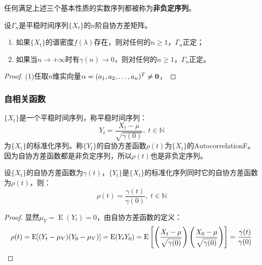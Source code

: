 \begin{definition}
	任何满足上述三个基本性质的实数序列都被称为\textbf{非负定序列}。
\end{definition}
\begin{theorem}\label{theo:GammaPositiveDefinite}
	设$\Gamma_n$是平稳时间序列$\{X_t\}$的$n$阶自协方差矩阵。
	\begin{enumerate}
		\item 如果$\{X_t\}$的谱密度$f(\lambda)$存在，则对任何的$n\geqslant1$，$\Gamma_n$正定；
		\item 如果当$n\to+\infty$时有$\gamma(n)\to0$，则对任何的$n\geqslant1$，$\Gamma_n$正定。
	\end{enumerate}
\end{theorem}
\begin{proof}
	(1)任取$n$维实向量$\alpha=(a_1, a_2, \dots, a_{n})^T\ne\mathbf{0}$，
\end{proof}
\subsubsection{自相关函数}
\begin{definition}
	$\{X_t\}$是一个平稳时间序列，称平稳时间序列：
	\begin{equation*}
		Y_t=\frac{X_t-\mu}{\sqrt{\gamma(0)}},\;t\in\mathbb{N}
	\end{equation*}
	为$\{X_t\}$的标准化序列。称$\{Y_t\}$的自协方差函数$\rho(t)$为$\{X_t\}$的\gls{AutocorrelationF}。因为自协方差函数都是非负定序列，所以$\rho(t)$也是非负定序列。
\end{definition}
\begin{theorem}\label{theo:RhotGamma0}
	设$\{X_t\}$的自协方差函数为$\gamma(t)$，$\{Y_t\}$是$\{X_t\}$的标准化序列同时它的自协方差函数为$\rho(t)$，则：
	\begin{equation*}
		\rho(t)=\frac{\gamma(t)}{\gamma(0)},\;t\in\mathbb{N}
	\end{equation*}
\end{theorem}
\begin{proof}
	显然$\mu_Y=\operatorname{E}(Y_t)=0$，由自协方差函数的定义：
	\begin{equation*}
		\rho(t)=\operatorname{E}[(Y_t-\mu_Y)(Y_0-\mu_Y)]=\operatorname{E}(Y_tY_0)=\operatorname{E}\left[\left(\frac{X_t-\mu}{\sqrt{\gamma(0)}}\right)\left(\frac{X_0-\mu}{\sqrt{\gamma(0)}}\right)\right]=\frac{\gamma(t)}{\gamma(0)}\qedhere
	\end{equation*}
\end{proof}
